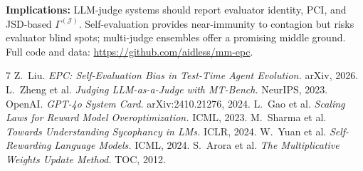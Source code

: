 \documentclass[letterpaper,10pt,twocolumn]{article}
\begin{document}
\textbf{Implications:} LLM-judge systems should report evaluator identity, PCI, and JSD-based $\Gamma^{(\mathcal{J})}$. Self-evaluation provides near-immunity to contagion but risks evaluator blind spots; multi-judge ensembles offer a promising middle ground. Full code and data: \url{https://github.com/aidless/mm-epc}.

\begin{thebibliography}{7}
\scriptsize
{} Z.~Liu. \textit{EPC: Self-Evaluation Bias in Test-Time Agent Evolution.} arXiv, 2026.
 L.~Zheng et al. \textit{Judging LLM-as-a-Judge with MT-Bench.} NeurIPS, 2023.
 OpenAI. \textit{GPT-4o System Card.} arXiv:2410.21276, 2024.
 L.~Gao et al. \textit{Scaling Laws for Reward Model Overoptimization.} ICML, 2023.
 M.~Sharma et al. \textit{Towards Understanding Sycophancy in LMs.} ICLR, 2024.
 W.~Yuan et al. \textit{Self-Rewarding Language Models.} ICML, 2024.
 S.~Arora et al. \textit{The Multiplicative Weights Update Method.} TOC, 2012.
\end{thebibliography}
\end{document}

